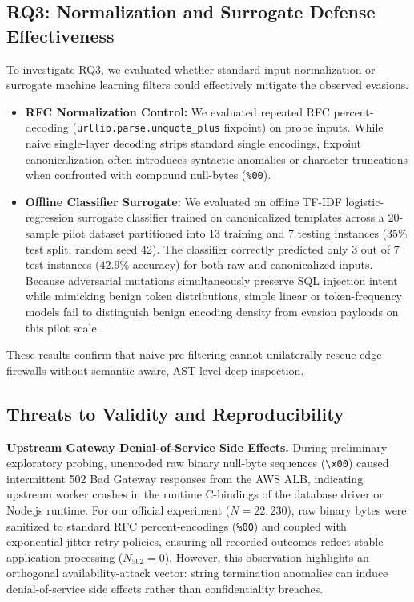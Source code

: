 \subsection{RQ3: Normalization and Surrogate Defense Effectiveness}
To investigate RQ3, we evaluated whether standard input normalization or surrogate machine learning filters could effectively mitigate the observed evasions.
\begin{itemize}
  \item \textbf{RFC Normalization Control:} We evaluated repeated RFC percent-decoding (\texttt{urllib.parse.unquote\_plus} fixpoint) on probe inputs. While naive single-layer decoding strips standard single encodings, fixpoint canonicalization often introduces syntactic anomalies or character truncations when confronted with compound null-bytes (\texttt{\%00}).
  \item \textbf{Offline Classifier Surrogate:} We evaluated an offline TF-IDF logistic-regression surrogate classifier trained on canonicalized templates across a 20-sample pilot dataset partitioned into 13 training and 7 testing instances (35\% test split, random seed 42). The classifier correctly predicted only 3 out of 7 test instances ($42.9\%$ accuracy) for both raw and canonicalized inputs. Because adversarial mutations simultaneously preserve SQL injection intent while mimicking benign token distributions, simple linear or token-frequency models fail to distinguish benign encoding density from evasion payloads on this pilot scale.
\end{itemize}
These results confirm that naive pre-filtering cannot unilaterally rescue edge firewalls without semantic-aware, AST-level deep inspection.

\subsection{Threats to Validity and Reproducibility}
\textbf{Upstream Gateway Denial-of-Service Side Effects.} During preliminary exploratory probing, unencoded raw binary null-byte sequences (\texttt{\textbackslash x00}) caused intermittent 502 Bad Gateway responses from the AWS ALB, indicating upstream worker crashes in the runtime C-bindings of the database driver or Node.js runtime. For our official experiment ($N=22{,}230$), raw binary bytes were sanitized to standard RFC percent-encodings (\texttt{\%00}) and coupled with exponential-jitter retry policies, ensuring all recorded outcomes reflect stable application processing ($N_{502}=0$). However, this observation highlights an orthogonal availability-attack vector: string termination anomalies can induce denial-of-service side effects rather than confidentiality breaches.

